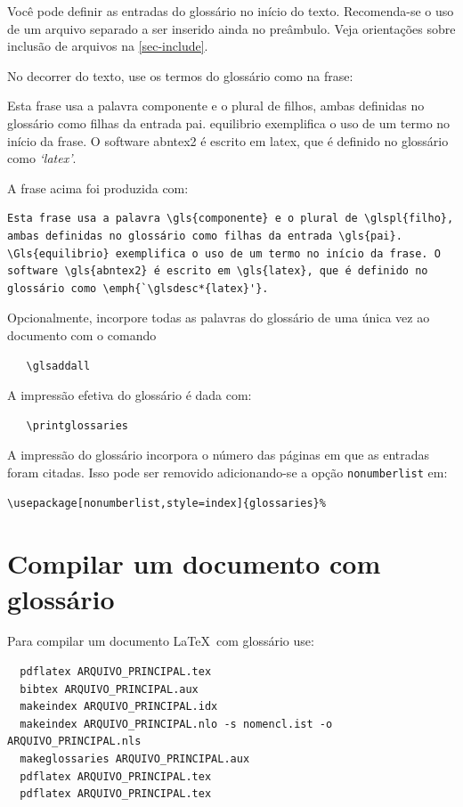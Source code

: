 Você pode definir as entradas do glossário no início do texto. Recomenda-se o
uso de um arquivo separado a ser inserido ainda no preâmbulo. Veja orientações
sobre inclusão de arquivos na \autoref{sec-include}.

No decorrer do texto, use os termos do glossário como na frase:

\begin{citacao}
Esta frase usa a palavra \gls{componente} e o plural de \glspl{filho},
ambas definidas no glossário como filhas da entrada \gls{pai}.
\Gls{equilibrio} exemplifica o uso de um termo no início da frase. O
software \gls{abntex2} é escrito em \gls{latex}, que é definido no
glossário como \emph{`\glsdesc*{latex}'}.
\end{citacao}


A frase acima foi produzida com:
\begin{verbatim}
Esta frase usa a palavra \gls{componente} e o plural de \glspl{filho},
ambas definidas no glossário como filhas da entrada \gls{pai}.
\Gls{equilibrio} exemplifica o uso de um termo no início da frase. O
software \gls{abntex2} é escrito em \gls{latex}, que é definido no
glossário como \emph{`\glsdesc*{latex}'}.
\end{verbatim}

Opcionalmente, incorpore todas as palavras do glossário de uma única vez ao
documento com o comando 
\begin{verbatim}
   \glsaddall
\end{verbatim}
 
A impressão efetiva do glossário é dada com:
\begin{verbatim}
   \printglossaries
\end{verbatim}

A impressão do glossário incorpora o número das páginas em que as entradas foram
citadas. Isso pode ser removido adicionando-se a opção \texttt{nonumberlist} em:
\begin{verbatim}
\usepackage[nonumberlist,style=index]{glossaries}%
\end{verbatim}

\section{Compilar um documento com glossário}
\label{sec-compilar-glossario}
 
Para compilar um documento \LaTeX\ com glossário use:
\begin{verbatim}
  pdflatex ARQUIVO_PRINCIPAL.tex
  bibtex ARQUIVO_PRINCIPAL.aux
  makeindex ARQUIVO_PRINCIPAL.idx 
  makeindex ARQUIVO_PRINCIPAL.nlo -s nomencl.ist -o ARQUIVO_PRINCIPAL.nls
  makeglossaries ARQUIVO_PRINCIPAL.aux
  pdflatex ARQUIVO_PRINCIPAL.tex
  pdflatex ARQUIVO_PRINCIPAL.tex
\end{verbatim}
 
